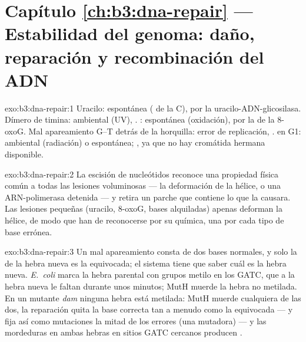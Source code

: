 \section*{Capítulo \ref{ch:b3:dna-repair} --- Estabilidad del genoma: daño, reparación y recombinación del ADN}

\begin{solution}{exo:b3:dna-repair:1}
Uracilo: espontánea ( de la C),  por la uracilo-ADN-glicosilasa. Dímero de timina: ambiental (UV),
. : espontánea
(oxidación),  por la  de la
8-oxoG. Mal apareamiento G--T detrás de la horquilla: error de
replicación, . 
en G1: ambiental (radiación) o espontánea; , ya que no hay cromátida hermana disponible.
\end{solution}

\begin{solution}{exo:b3:dna-repair:2}
La escisión de nucleótidos reconoce una propiedad física común a todas
las lesiones voluminosas --- la deformación de la hélice, o una
ARN-polimerasa detenida --- y retira un parche que contiene lo que la
causara. Las lesiones pequeñas (uracilo, 8-oxoG, bases alquiladas) apenas
deforman la hélice, de modo que han de reconocerse por su química, una
 por cada tipo de base errónea.
\end{solution}

\begin{solution}{exo:b3:dna-repair:3}
Un mal apareamiento consta de dos bases normales, y solo la de la hebra
nueva es la equivocada; el sistema tiene que saber cuál es la hebra
nueva. \emph{E.~coli} marca la hebra parental con grupos metilo en los
GATC, que a la hebra nueva le faltan durante unos minutos; MutH muerde la
hebra no metilada. En un mutante \emph{dam} ninguna hebra está metilada:
MutH muerde cualquiera de las dos, la reparación quita la base correcta
tan a menudo como la equivocada --- y fija así como mutaciones la mitad
de los errores (una mutadora) --- y las mordeduras en ambas hebras en
sitios GATC cercanos producen .
\end{solution}

